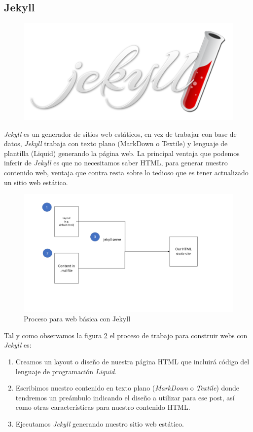 \subsection*{Jekyll}
\label{subsec:jekyll}
\begin{figure}[h]
    \centering
    \includegraphics[scale=0.3]{img/logo_jekyll.png}
    \label{img:logoJekyll}
\end{figure}
\emph{Jekyll} es un generador de sitios web estáticos, en vez de trabajar con base de datos, \emph{Jekyll} trabaja con texto plano (MarkDown o Textile) y lenguaje de plantilla (Liquid)  generando la página web. La principal ventaja que podemos inferir de \emph{Jekyll} es que no necesitamos saber HTML, para generar nuestro contenido web, ventaja que contra resta sobre lo tedioso que es tener actualizado un sitio web estático. \\
\begin{figure}[H]
    \centering
    \includegraphics[width=\textwidth]{img/jeyll_process.png}
    \caption{Proceso para web básica con Jekyll}
    \label{fig:jekyllProc}
\end{figure}
Tal y como observamos la figura \ref{fig:jekyllProc} el proceso de trabajo para construir webs con \emph{Jekyll} es:
\begin{enumerate}
    \item Creamos un layout o diseño de nuestra página HTML que incluirá  código del lenguaje de programación \emph{Liquid}.
    \item Escribimos nuestro contenido en texto plano (\emph{MarkDown} o \emph{Textile}) donde tendremos un preámbulo indicando el diseño a utilizar para ese post, así como otras características para nuestro contenido HTML.
    \item Ejecutamos \emph{Jekyll} generando nuestro sitio web estático.
\end{enumerate}

